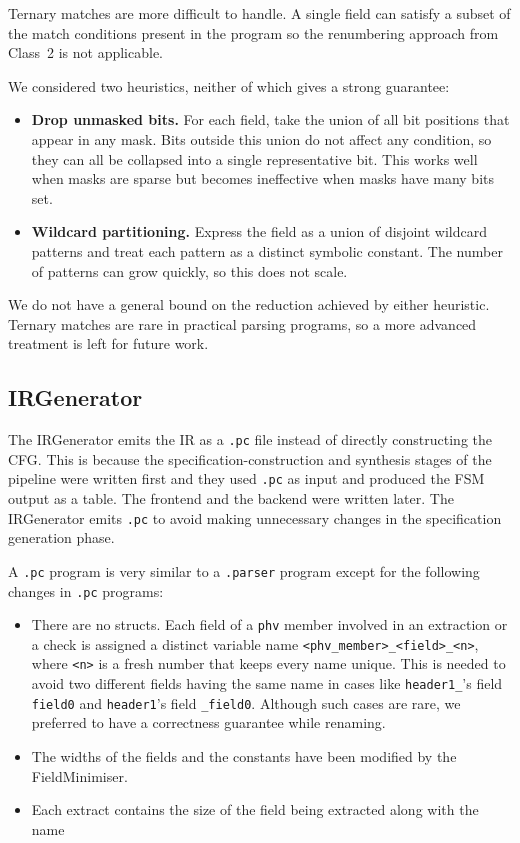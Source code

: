 Ternary matches are more difficult to handle. A single
field can satisfy a subset of the match conditions present in the program 
so the renumbering approach from Class~2 is not applicable. 


We considered two heuristics, neither of which gives a strong guarantee:
\begin{itemize}
    \item \textbf{Drop unmasked bits.} For each field, take the union of
    all bit positions that appear in any mask. Bits outside this union do
    not affect any condition, so they can all be collapsed into a single
    representative bit. This works well when masks are sparse but becomes ineffective
    when masks have many bits set.

    \item \textbf{Wildcard partitioning.} Express the field as a union of
    disjoint wildcard patterns and treat each pattern as a distinct
    symbolic constant. The number of patterns can grow quickly, so this
    does not scale.
\end{itemize}

We do not have a general bound on the reduction achieved by either heuristic.
Ternary matches are rare in practical parsing programs, so a more advanced treatment is left for future work.

\subsection{IRGenerator}

The IRGenerator emits the IR as a \texttt{.pc} file instead of directly
constructing the CFG. This is because the
specification-construction and synthesis stages of the pipeline were written
first and they used \texttt{.pc} as input and produced the FSM
output as a table. The frontend and the backend were written later. The
IRGenerator emits \texttt{.pc} to avoid making unnecessary changes in the
specification generation phase.


A \texttt{.pc} program is very similar to a \texttt{.parser} program except 
for the following changes in \texttt{.pc} programs:

\begin{itemize}
    \item There are no structs. Each field of a \texttt{phv} member
    involved in an extraction or a check is assigned a distinct variable
    name \texttt{<phv\_member>\_<field>\_<n>}, where \texttt{<n>} is a fresh
    number that keeps every name unique. This is needed to avoid two
    different fields having the same name in cases like \texttt{header1\_}'s
    field \texttt{field0} and \texttt{header1}'s field \texttt{\_field0}.
    Although such cases are rare, we preferred to have a correctness
    guarantee while renaming.

    \item The widths of the fields and the constants have been modified by the 
    FieldMinimiser.

    \item Each extract contains the size of the field being extracted along with the name

\end{itemize}

